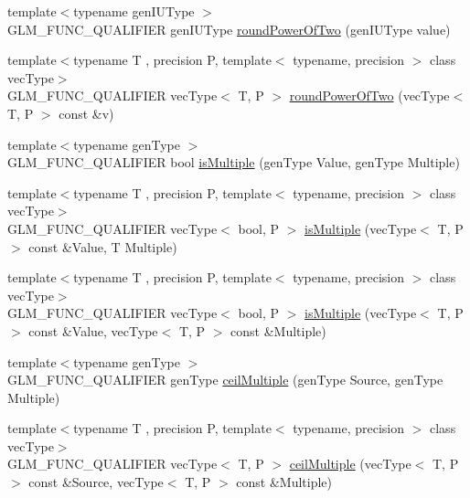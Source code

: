 \begin{DoxyCompactItemize}
\item 
{\footnotesize template$<$typename gen\+I\+U\+Type $>$ }\\G\+L\+M\+\_\+\+F\+U\+N\+C\+\_\+\+Q\+U\+A\+L\+I\+F\+I\+E\+R gen\+I\+U\+Type \hyperlink{group__gtc__round_ga6d24a9e3abe3e6a908661b43acb8efe0}{round\+Power\+Of\+Two} (gen\+I\+U\+Type value)
\item 
{\footnotesize template$<$typename T , precision P, template$<$ typename, precision $>$ class vec\+Type$>$ }\\G\+L\+M\+\_\+\+F\+U\+N\+C\+\_\+\+Q\+U\+A\+L\+I\+F\+I\+E\+R vec\+Type$<$ T, P $>$ \hyperlink{group__gtc__round_gae95be3b384f3bbd00c6c1cf0a1f96485}{round\+Power\+Of\+Two} (vec\+Type$<$ T, P $>$ const \&v)
\item 
{\footnotesize template$<$typename gen\+Type $>$ }\\G\+L\+M\+\_\+\+F\+U\+N\+C\+\_\+\+Q\+U\+A\+L\+I\+F\+I\+E\+R bool \hyperlink{namespaceglm_a1749b696a2f7a956da67d67a557ae134}{is\+Multiple} (gen\+Type Value, gen\+Type Multiple)
\item 
{\footnotesize template$<$typename T , precision P, template$<$ typename, precision $>$ class vec\+Type$>$ }\\G\+L\+M\+\_\+\+F\+U\+N\+C\+\_\+\+Q\+U\+A\+L\+I\+F\+I\+E\+R vec\+Type$<$ bool, P $>$ \hyperlink{group__gtc__round_ga50ea5d5dc33fffba39ad6002a3784123}{is\+Multiple} (vec\+Type$<$ T, P $>$ const \&Value, T Multiple)
\item 
{\footnotesize template$<$typename T , precision P, template$<$ typename, precision $>$ class vec\+Type$>$ }\\G\+L\+M\+\_\+\+F\+U\+N\+C\+\_\+\+Q\+U\+A\+L\+I\+F\+I\+E\+R vec\+Type$<$ bool, P $>$ \hyperlink{group__gtc__round_ga7ae705574ef3e3ebfb4f537d8d285c48}{is\+Multiple} (vec\+Type$<$ T, P $>$ const \&Value, vec\+Type$<$ T, P $>$ const \&Multiple)
\item 
{\footnotesize template$<$typename gen\+Type $>$ }\\G\+L\+M\+\_\+\+F\+U\+N\+C\+\_\+\+Q\+U\+A\+L\+I\+F\+I\+E\+R gen\+Type \hyperlink{group__gtc__round_gac84898c466e609cdd2e81d9ba907d9e8}{ceil\+Multiple} (gen\+Type Source, gen\+Type Multiple)
\item 
{\footnotesize template$<$typename T , precision P, template$<$ typename, precision $>$ class vec\+Type$>$ }\\G\+L\+M\+\_\+\+F\+U\+N\+C\+\_\+\+Q\+U\+A\+L\+I\+F\+I\+E\+R vec\+Type$<$ T, P $>$ \hyperlink{group__gtc__round_gafe632af669ac57d670ca18e3665a12ca}{ceil\+Multiple} (vec\+Type$<$ T, P $>$ const \&Source, vec\+Type$<$ T, P $>$ const \&Multiple)

\end{DoxyCompactItemize}
